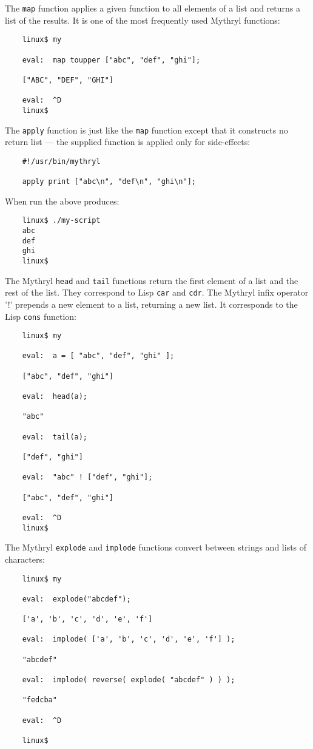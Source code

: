 The {\tt map} function applies a given function to all elements of a 
list and returns a list of the results.  It is one of the most 
frequently used Mythryl functions:

\begin{verbatim}
    linux$ my

    eval:  map toupper ["abc", "def", "ghi"];

    ["ABC", "DEF", "GHI"]

    eval:  ^D
    linux$
\end{verbatim}

The {\tt apply} function is just like the {\tt map} function except that 
it constructs no return list --- the supplied function is applied only 
for side-effects:

\begin{verbatim}
    #!/usr/bin/mythryl

    apply print ["abc\n", "def\n", "ghi\n"];
\end{verbatim}

When run the above produces:

\begin{verbatim}
    linux$ ./my-script
    abc
    def
    ghi
    linux$
\end{verbatim}

The Mythryl {\tt head} and {\tt tail} functions return the first 
element of a list and the rest of the list.  They correspond to Lisp {\tt car} 
and {\tt cdr}.  The Mythryl infix operator '!' prepends a new element to a 
list, returning a new list.  It corresponds to the Lisp {\tt cons} function:

\begin{verbatim}
    linux$ my

    eval:  a = [ "abc", "def", "ghi" ];

    ["abc", "def", "ghi"]

    eval:  head(a);

    "abc"

    eval:  tail(a);

    ["def", "ghi"]

    eval:  "abc" ! ["def", "ghi"];

    ["abc", "def", "ghi"]

    eval:  ^D
    linux$ 
\end{verbatim}

The Mythryl {\tt explode} and {\tt implode} functions convert 
between strings and lists of characters:

\begin{verbatim}
    linux$ my

    eval:  explode("abcdef");

    ['a', 'b', 'c', 'd', 'e', 'f']

    eval:  implode( ['a', 'b', 'c', 'd', 'e', 'f'] );

    "abcdef"

    eval:  implode( reverse( explode( "abcdef" ) ) );

    "fedcba"

    eval:  ^D

    linux$
\end{verbatim}


